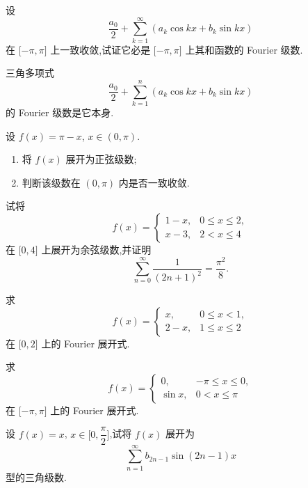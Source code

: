 \documentclass[../数学分析培优讲义.tex]{subfiles}
\begin{document}
\begin{example}
设
\[
    \dfrac{a_0}{2}+\sum\limits_{k=1}^{\infty}(a_k\cos kx+b_k\sin kx)
\]
在 $\lbrack -\pi,\pi\rbrack$ 上一致收敛,试证它必是 $\lbrack -\pi,\pi\rbrack$ 上其和函数的 Fourier 级数.
\end{example}
\exampleblank

\begin{example}[\markstar]
三角多项式
\[
    \dfrac{a_0}{2}+\sum\limits_{k=1}^{n}(a_k\cos kx+b_k\sin kx)
\]
的 Fourier 级数是它本身.
\end{example}
\exampleblank

\begin{example}
设 $f(x)=\pi-x$, $x\in(0,\pi)$.
\begin{enumerate}[label=(\arabic*)]
    \item 将 $f(x)$ 展开为正弦级数;
    \item 判断该级数在 $(0,\pi)$ 内是否一致收敛.
\end{enumerate}
\end{example}
\exampleblank

\begin{example}
试将
\[
    f(x)=
    \begin{cases}
        1-x,&0\leq x\leq2,\\
        x-3,&2<x\leq4
    \end{cases}
\]
在 $\lbrack 0,4\rbrack$ 上展开为余弦级数,并证明
\[
    \sum\limits_{n=0}^{\infty}\dfrac{1}{(2n+1)^2}=\dfrac{\pi^2}{8}.
\]
\end{example}
\exampleblank

\begin{example}
求
\[
    f(x)=
    \begin{cases}
        x,&0\leq x<1,\\
        2-x,&1\leq x\leq2
    \end{cases}
\]
在 $\lbrack 0,2\rbrack$ 上的 Fourier 展开式.
\end{example}
\exampleblank

\begin{example}
求
\[
    f(x)=
    \begin{cases}
        0,&-\pi\leq x\leq0,\\
        \sin x,&0<x\leq\pi
    \end{cases}
\]
在 $\lbrack -\pi,\pi\rbrack$ 上的 Fourier 展开式.
\end{example}
\exampleblank

\begin{example}
设 $f(x)=x$, $x\in\lbrack 0,\dfrac{\pi}{2}\rbrack$,试将 $f(x)$ 展开为
\[
    \sum\limits_{n=1}^{\infty}b_{2n-1}\sin(2n-1)x
\]
型的三角级数.
\end{example}
\exampleblank
\end{document}
